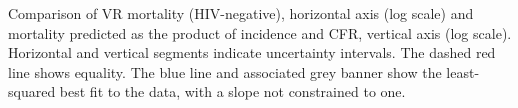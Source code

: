 \label{fig:mvalidity}Comparison of VR mortality (HIV-negative), horizontal axis (log scale) and mortality predicted as the product of incidence and CFR, vertical axis (log scale). Horizontal and vertical segments indicate uncertainty intervals. The dashed red line shows equality. The blue line and associated grey banner show the least-squared best fit to the data, with a slope not constrained to one. 